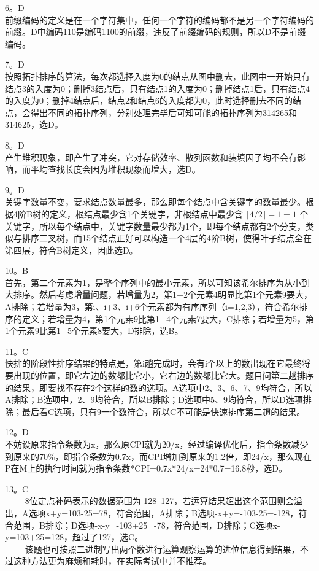 6。D \\
前缀编码的定义是在一个字符集中，任何一个字符的编码都不是另一个字符编码的前缀。D中编码110是编码1100的前缀，违反了前缀编码的规则，所以D不是前缀编码。

7。D \\
按照拓扑排序的算法，每次都选择入度为0的结点从图中删去，此图中一开始只有结点3的入度为0；删掉3结点后，只有结点1的入度为0；删掉结点1后，只有结点4的入度为0；删掉4结点后，结点2和结点6的入度都为0，此时选择删去不同的结点，会得出不同的拓扑序列，分别处理完毕后可知可能的拓扑序列为314265和314625，选D。

8。D \\
产生堆积现象，即产生了冲突，它对存储效率、散列函数和装填因子均不会有影响，而平均查找长度会因为堆积现象而增大，选D。

9。D \\
关键字数量不变，要求结点数量最多，那么即每个结点中含关键字的数量最少。根据4阶B树的定义，根结点最少含1个关键字，非根结点中最少含 $\lceil4/2\rceil-1=1$ 个关键字，所以每个结点中，关键字数量最少都为1个，即每个结点都有2个分支，类似与排序二叉树，而15个结点正好可以构造一个4层的4阶B树，使得叶子结点全在第四层，符合B树定义，因此选D。

10。B \\
首先，第二个元素为1，是整个序列中的最小元素，所以可知该希尔排序为从小到大排序。然后考虑增量问题，若增量为2，第1+2个元素4明显比第1个元素9要大，A排除；若增量为3，第i、i+3、i+6个元素都为有序序列（i=1,2,3），符合希尔排序的定义；若增量为4，第1个元素9比第1+4个元素7要大，C排除；若增量为5，第1个元素9比第1+5个元素8要大，D排除，选B。

11。C \\
快排的阶段性排序结果的特点是，第i趟完成时，会有i个以上的数出现在它最终将要出现的位置，即它左边的数都比它小，它右边的数都比它大。题目问第二趟排序的结果，即要找不存在2个这样的数的选项。A选项中2、3、6、7、9均符合，所以A排除；B选项中，2、9均符合，所以B排除；D选项中5、9均符合，所以D选项排除；最后看C选项，只有9一个数符合，所以C不可能是快速排序第二趟的结果。

12。D \\
不妨设原来指令条数为x，那么原CPI就为20/x，经过编译优化后，指令条数减少到原来的70\%，即指令条数为0.7x，而CPI增加到原来的1.2倍，即24/x，那么现在P在M上的执行时间就为指令条数*CPI=0.7x*24/x=24*0.7=16.8秒，选D。

13。C \\
$\qquad$ 8位定点补码表示的数据范围为-128~127，若运算结果超出这个范围则会溢出，A选项x+y=103-25=78，符合范围，A排除；B选项-x+y=-103-25=-128，符合范围，B排除；D选项-x-y=-103+25=-78，符合范围，D排除；C选项x-y=103+25=128，超过了127，选C。 \\
$\qquad$ 该题也可按照二进制写出两个数进行运算观察运算的进位信息得到结果，不过这种方法更为麻烦和耗时，在实际考试中并不推荐。

